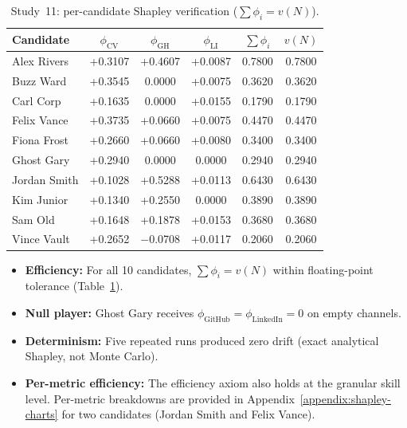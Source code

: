 \begin{table}[htbp]
    \centering
    \caption[Study~11: Shapley verification]{Study~11: per-candidate Shapley verification ($\sum \phi_i = v(N)$).}
    \label{tab:shapley-verification}
    \vspace{1.5ex}
    \small
    \setlength{\tabcolsep}{7pt}
    \begin{tabular}{l c c c c c}
        \toprule
        \textbf{Candidate} & $\phi_{\mathrm{CV}}$ & $\phi_{\mathrm{GH}}$ & $\phi_{\mathrm{LI}}$ & $\sum \phi_i$ & $v(N)$ \\ \midrule
        Alex Rivers   & +0.3107 & +0.4607 & +0.0087 & 0.7800 & 0.7800 \\
        Buzz Ward     & +0.3545 &  0.0000 & +0.0075 & 0.3620 & 0.3620 \\
        Carl Corp     & +0.1635 &  0.0000 & +0.0155 & 0.1790 & 0.1790 \\
        Felix Vance   & +0.3735 & +0.0660 & +0.0075 & 0.4470 & 0.4470 \\
        Fiona Frost   & +0.2660 & +0.0660 & +0.0080 & 0.3400 & 0.3400 \\
        Ghost Gary    & +0.2940 &  0.0000 &  0.0000 & 0.2940 & 0.2940 \\
        Jordan Smith  & +0.1028 & +0.5288 & +0.0113 & 0.6430 & 0.6430 \\
        Kim Junior    & +0.1340 & +0.2550 &  0.0000 & 0.3890 & 0.3890 \\
        Sam Old       & +0.1648 & +0.1878 & +0.0153 & 0.3680 & 0.3680 \\
        Vince Vault   & +0.2652 & $-$0.0708 & +0.0117 & 0.2060 & 0.2060 \\ \bottomrule
    \end{tabular}
\end{table}

\begin{itemize}
    \item \textbf{Efficiency:} For all 10 candidates, $\sum \phi_i = v(N)$ within floating-point tolerance (Table~\ref{tab:shapley-verification}).

    \item \textbf{Null player:} Ghost Gary receives $\phi_{\text{GitHub}} = \phi_{\text{LinkedIn}} = 0$ on empty channels.

    \item \textbf{Determinism:} Five repeated runs produced zero drift (exact analytical Shapley, not Monte Carlo).

    \item \textbf{Per-metric efficiency:} The efficiency axiom also holds at the granular skill level. Per-metric breakdowns are
    provided in Appendix~\ref{appendix:shapley-charts} for two candidates (Jordan Smith and Felix Vance).
\end{itemize}

